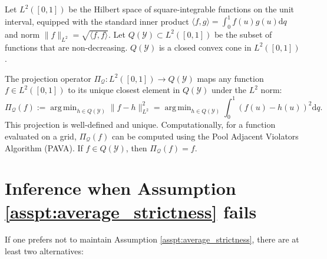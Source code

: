 \documentclass[12pt]{article}
\DeclareMathOperator*{\argmin}{arg\,min}
\newcommand{\calQ}{Q(\mathcal{Y})} %
\newcommand{\dd}{\mathrm{d}} %
\begin{document}
Let $L^2([0,1])$ be the Hilbert space of square-integrable functions on the unit interval, equipped with the standard inner product $\langle f, g \rangle = \int_0^1 f(u) g(u) \dd q$ and norm $\|f\|_{L^2} = \sqrt{\langle f, f \rangle}$. Let $\calQ \subset L^2([0,1])$ be the subset of functions that are non-decreasing. $\calQ$ is a closed convex cone in $L^2([0,1])$.

The projection operator $\Pi_{\mathcal{Q}}: L^2([0,1]) \to \calQ$ maps any function $f \in L^2([0,1])$ to its unique closest element in $\calQ$ under the $L^2$ norm:
\[ \Pi_{\mathcal{Q}}(f) := \argmin_{h \in \calQ} \| f - h \|_{L^2}^2 = \argmin_{h \in \calQ} \int_0^1 (f(u) - h(u))^2 \dd q. \]
This projection is well-defined and unique. Computationally, for a function evaluated on a grid, $\Pi_{\mathcal{Q}}(f)$ can be computed using the Pool Adjacent Violators Algorithm (PAVA). If $f \in \calQ$, then $\Pi_{\mathcal{Q}}(f) = f$.


\section{Inference when Assumption \ref{asspt:average_strictness} fails}
\label{app:inference_wo_average_strictness}


If one prefers not to maintain Assumption \ref{asspt:average_strictness}, there are at least two alternatives:
\end{document}
